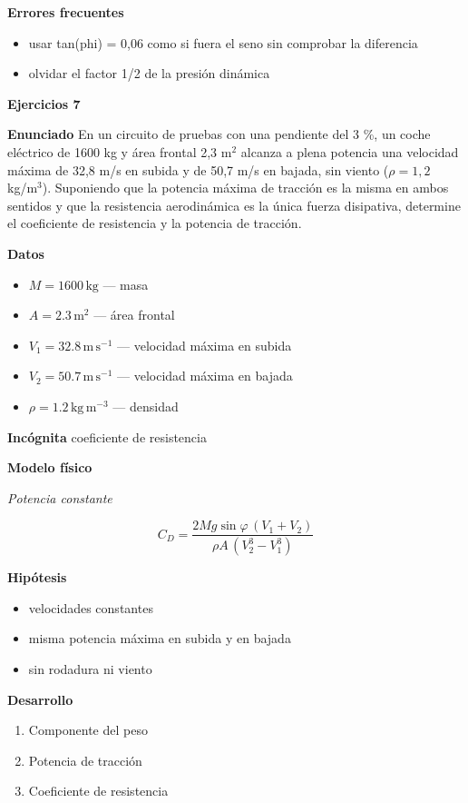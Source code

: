 \documentclass[10pt,openany]{book}
\begin{document}
\noindent\textbf{Errores frecuentes}
\begin{itemize}
\item usar tan(phi) = 0,06 como si fuera el seno sin comprobar la diferencia
\item olvidar el factor 1/2 de la presión dinámica
\end{itemize}

\noindent\textbf{Ejercicios 7}

\noindent\textbf{Enunciado}
En un circuito de pruebas con una pendiente del 3 \%, un coche eléctrico de 1600 kg y área frontal 2,3 m\(^2\) alcanza a plena potencia una velocidad máxima de 32,8 m/s en subida y de 50,7 m/s en bajada, sin viento (\(\rho = 1{,}2\) kg/m\(^3\)). Suponiendo que la potencia máxima de tracción es la misma en ambos sentidos y que la resistencia aerodinámica es la única fuerza disipativa, determine el coeficiente de resistencia y la potencia de tracción.

\noindent\textbf{Datos}
\begin{itemize}
\item $M = 1600\,\mathrm{kg}$ — masa
\item $A = 2.3\,\mathrm{m}^{2}$ — área frontal
\item $V_{1} = 32.8\,\mathrm{m}\,\mathrm{s}^{-1}$ — velocidad máxima en subida
\item $V_{2} = 50.7\,\mathrm{m}\,\mathrm{s}^{-1}$ — velocidad máxima en bajada
\item $\rho = 1.2\,\mathrm{kg}\,\mathrm{m}^{-3}$ — densidad
\end{itemize}

\noindent\textbf{Incógnita}
coeficiente de resistencia

\noindent\textbf{Modelo físico}

\noindent\textit{Potencia constante}

\[
C_D = \frac{2Mg\sin\varphi\,(V_1 + V_2)}{\rho A\,(V_2^{3} - V_1^{3})}
\]

\noindent\textbf{Hipótesis}
\begin{itemize}
\item velocidades constantes
\item misma potencia máxima en subida y en bajada
\item sin rodadura ni viento
\end{itemize}

\noindent\textbf{Desarrollo}
\begin{enumerate}
\item
Componente del peso
\item
Potencia de tracción
\item
Coeficiente de resistencia
\end{enumerate}
\end{document}

